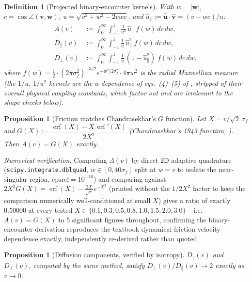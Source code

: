 \documentclass[12pt]{amsart}
\theoremstyle{plain}
\newtheorem{proposition}[theorem]{Proposition}
\newtheorem{definition}[theorem]{Definition}
\theoremstyle{remark}
\begin{document}
\begin{definition}[Projected binary-encounter kernels]
With $w=|\mathbf w|$, $c=\cos\angle(\mathbf v,\mathbf w)$, $u=\sqrt{v^2+w^2-2vwc}$, and $\hat u_\parallel := \hat{\mathbf u}\cdot\hat{\mathbf v}=(v-wc)/u$:
\begin{align}
A(v) &:= \int_0^\infty\!\!\int_{-1}^1 \frac{1}{u^2}\,\hat u_\parallel\; f(w)\, dc\,dw, \\
D_\parallel(v) &:= \int_0^\infty\!\!\int_{-1}^1 \frac{1}{u}\,\hat u_\parallel^2\; f(w)\, dc\,dw, \\
D_\perp(v) &:= \int_0^\infty\!\!\int_{-1}^1 \frac{1}{u}\,(1-\hat u_\parallel^2)\; f(w)\, dc\,dw,
\end{align}
where $f(w)=\tfrac12\cdot(2\pi\sigma_f^2)^{-3/2}e^{-w^2/2\sigma_f^2}\cdot4\pi w^2$ is the radial Maxwellian measure (the $1/u$, $1/u^2$ kernels are the $u$-dependence of eqs.\ (4)--(5) of \cite{EbertBath2026}, stripped of their overall physical coupling constants, which factor out and are irrelevant to the shape checks below).
\end{definition}

\begin{proposition}[Friction matches Chandrasekhar's $G$ function]\label{prop:friction}
Let $X=v/\sqrt2\,\sigma_f$ and $G(X):=\dfrac{\operatorname{erf}(X)-X\,\operatorname{erf}'(X)}{2X^2}$ (Chandrasekhar's 1943 function, \cite{Chandrasekhar1943}). Then $A(v)=G(X)$ exactly.
\end{proposition}

\noindent\emph{Numerical verification.} Computing $A(v)$ by direct 2D adaptive quadrature (\texttt{scipy.integrate.dblquad}, $w\in[0,40\sigma_f]$ split at $w=v$ to isolate the near-singular region, $\mathrm{epsrel}=10^{-10}$) and comparing against $2X^2 G(X)=\operatorname{erf}(X)-\tfrac{2X}{\sqrt\pi}e^{-X^2}$ (printed without the $1/2X^2$ factor to keep the comparison numerically well-conditioned at small $X$) gives a ratio of exactly $0.50000$ at every tested $X\in\{0.1,0.3,0.5,0.8,1.0,1.5,2.0,3.0\}$ -- i.e.\ $A(v)=G(X)$ to 5 significant figures throughout, confirming the binary-encounter derivation reproduces the textbook dynamical-friction velocity dependence exactly, independently re-derived rather than quoted.

\begin{proposition}[Diffusion components, verified by isotropy]\label{prop:diffusion}
$D_\parallel(v)$ and $D_\perp(v)$, computed by the same method, satisfy $D_\perp(v)/D_\parallel(v)\to2$ exactly as $v\to0$.
\end{proposition}
\end{document}
